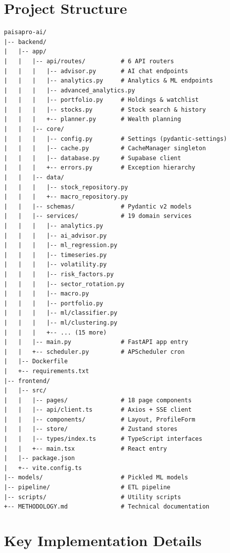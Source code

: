 \documentclass[12pt, a4paper, oneside]{report}
\begin{document}
\section{Project Structure}
\label{sec:project_structure}

\begin{lstlisting}[style=pythonstyle, caption={Project directory structure}, label={lst:project_structure}, language={}]
paisapro-ai/
|-- backend/
|   |-- app/
|   |   |-- api/routes/          # 6 API routers
|   |   |   |-- advisor.py       # AI chat endpoints
|   |   |   |-- analytics.py     # Analytics & ML endpoints
|   |   |   |-- advanced_analytics.py
|   |   |   |-- portfolio.py     # Holdings & watchlist
|   |   |   |-- stocks.py        # Stock search & history
|   |   |   +-- planner.py       # Wealth planning
|   |   |-- core/
|   |   |   |-- config.py        # Settings (pydantic-settings)
|   |   |   |-- cache.py         # CacheManager singleton
|   |   |   |-- database.py      # Supabase client
|   |   |   +-- errors.py        # Exception hierarchy
|   |   |-- data/
|   |   |   |-- stock_repository.py
|   |   |   +-- macro_repository.py
|   |   |-- schemas/             # Pydantic v2 models
|   |   |-- services/            # 19 domain services
|   |   |   |-- analytics.py
|   |   |   |-- ai_advisor.py
|   |   |   |-- ml_regression.py
|   |   |   |-- timeseries.py
|   |   |   |-- volatility.py
|   |   |   |-- risk_factors.py
|   |   |   |-- sector_rotation.py
|   |   |   |-- macro.py
|   |   |   |-- portfolio.py
|   |   |   |-- ml/classifier.py
|   |   |   |-- ml/clustering.py
|   |   |   +-- ... (15 more)
|   |   |-- main.py              # FastAPI app entry
|   |   +-- scheduler.py         # APScheduler cron
|   |-- Dockerfile
|   +-- requirements.txt
|-- frontend/
|   |-- src/
|   |   |-- pages/               # 18 page components
|   |   |-- api/client.ts        # Axios + SSE client
|   |   |-- components/          # Layout, ProfileForm
|   |   |-- store/               # Zustand stores
|   |   |-- types/index.ts       # TypeScript interfaces
|   |   +-- main.tsx             # React entry
|   |-- package.json
|   +-- vite.config.ts
|-- models/                      # Pickled ML models
|-- pipeline/                    # ETL pipeline
|-- scripts/                     # Utility scripts
+-- METHODOLOGY.md               # Technical documentation
\end{lstlisting}

\section{Key Implementation Details}
\label{sec:key_implementations}
\end{document}
